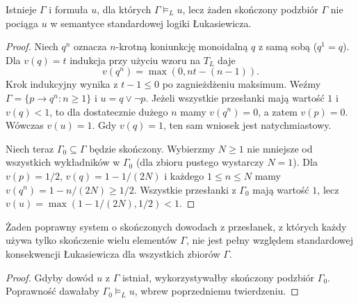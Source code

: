 \begin{twierdzenie}
\label{thm:lst-fuzzy-noncompactness}
Istnieje $\Gamma$ i formuła $u$, dla których
$\Gamma\models_L u$, lecz żaden skończony podzbiór $\Gamma$
nie pociąga $u$ w semantyce standardowej logiki Łukasiewicza.
\end{twierdzenie}
\begin{proof}
Niech $q^n$ oznacza $n$-krotną koniunkcję monoidalną $q$ z samą sobą
($q^1=q$). Dla $v(q)=t$ indukcja przy użyciu wzoru na $T_L$ daje
\[
v(q^n)=\max(0,nt-(n-1)).
\]
Krok indukcyjny wynika z $t-1\leq0$ po zagnieżdżeniu maksimum.
Weźmy $\Gamma=\{p\to q^n:n\geq1\}$ i $u=q\vee\neg p$.
Jeżeli wszystkie przesłanki mają wartość $1$ i $v(q)<1$, to dla
dostatecznie dużego $n$ mamy $v(q^n)=0$, a zatem $v(p)=0$.
Wówczas $v(u)=1$. Gdy $v(q)=1$, ten sam wniosek jest natychmiastowy.

Niech teraz $\Gamma_0\subseteq\Gamma$ będzie skończony.
Wybierzmy $N\geq1$ nie mniejsze od wszystkich wykładników
w $\Gamma_0$ (dla zbioru pustego wystarczy $N=1$).
Dla $v(p)=1/2$, $v(q)=1-1/(2N)$ i każdego $1\leq n\leq N$
mamy $v(q^n)=1-n/(2N)\geq1/2$. Wszystkie przesłanki z $\Gamma_0$
mają wartość $1$, lecz
$v(u)=\max(1-1/(2N),1/2)<1$.
\end{proof}
\begin{wniosek}\label{cor:ncl-no-finitary-standard-mv}
Żaden poprawny system o skończonych dowodach z przesłanek, z których
każdy używa tylko skończenie wielu elementów $\Gamma$, nie jest
pełny względem standardowej konsekwencji Łukasiewicza dla wszystkich
zbiorów $\Gamma$.
\end{wniosek}
\begin{proof}
Gdyby dowód $u$ z $\Gamma$ istniał, wykorzystywałby skończony
podzbiór $\Gamma_0$. Poprawność dawałaby $\Gamma_0\models_L u$,
wbrew poprzedniemu twierdzeniu.
\end{proof}

